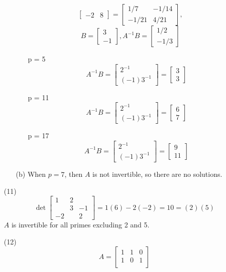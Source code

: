 \documentclass[12pt]{article}
\begin{document}
\begin{itemize}
\begin{itemize}
$$\begin{bmatrix}
-2 & 8
\end{bmatrix} = \begin{bmatrix}
1/7 & -1/14 \\
-1/21 & 4/21
\end{bmatrix},$$
$$B = \begin{bmatrix}
3 \\
-1
\end{bmatrix}, A^{-1}B = \begin{bmatrix}
1/2 \\
-1/3
\end{bmatrix}$$
\begin{itemize}
\item[p = 5]
$$A^{-1}B = \begin{bmatrix}
2^{-1} \\
(-1)3^{-1}
\end{bmatrix} = \begin{bmatrix}
3 \\
3
\end{bmatrix}$$
\item[p = 11]
$$A^{-1}B = \begin{bmatrix}
2^{-1} \\
(-1)3^{-1}
\end{bmatrix} = \begin{bmatrix}
6 \\
7
\end{bmatrix}$$
\item[p = 17]
$$A^{-1}B = \begin{bmatrix}
2^{-1} \\
(-1)3^{-1}
\end{bmatrix} = \begin{bmatrix}
9 \\
11
\end{bmatrix}$$
\end{itemize}
\item[(b)]
When $p = 7$, then $A$ is not invertible, so there are no solutions.
\end{itemize}
\item[(11)]
$$\det \begin{bmatrix}
1 & 2 \\
& 3 & -1 \\
-2 & & 2
\end{bmatrix} = 1(6) - 2(-2) = 10 = (2)(5)$$
$A$ is invertible for all primes excluding 2 and 5.
\item[(12)]
$$A = \begin{bmatrix}
1 & 1 & 0 \\
1 & 0 & 1 \\

\end{bmatrix}$$
\end{itemize}
\end{document}
